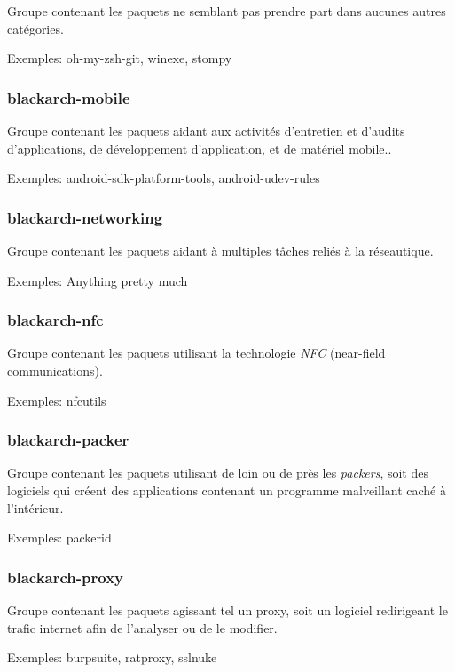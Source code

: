 \documentclass[a4paper, oneside, 11pt]{book}
\begin{document}
Groupe contenant les paquets ne semblant pas prendre part dans aucunes autres
catégories.

Exemples: oh-my-zsh-git, winexe, stompy

\subsubsection{blackarch-mobile}

Groupe contenant les paquets aidant aux activités d'entretien et d'audits 
d'applications, de développement d'application, et de matériel mobile..

Exemples: android-sdk-platform-tools, android-udev-rules

\subsubsection{blackarch-networking}

Groupe contenant les paquets aidant à multiples tâches reliés à la réseautique.

Exemples: Anything pretty much

\subsubsection{blackarch-nfc}

Groupe contenant les paquets utilisant la technologie \textit{NFC} (near-field
communications).

Exemples: nfcutils

\subsubsection{blackarch-packer}

Groupe contenant les paquets utilisant de loin ou de près les \textit{packers},
soit des logiciels qui créent des applications contenant un programme 
malveillant caché à l'intérieur.

Exemples: packerid

\subsubsection{blackarch-proxy}

Groupe contenant les paquets agissant tel un proxy, soit un logiciel redirigeant
le trafic internet afin de l'analyser ou de le modifier.

Exemples: burpsuite, ratproxy, sslnuke
\end{document}
